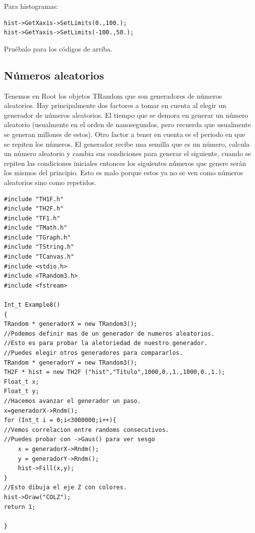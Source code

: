 \documentclass{article}
\begin{document}
Para histogramas:

\begin{tcolorbox} [breakable]
\begin{verbatim}
hist->GetXaxis->SetLimits(0.,100.);
hist->GetYaxis->SetLimits(-100.,50.);
\end{verbatim}
\end{tcolorbox}

Pru\'ebalo para los c\'odigos de arriba.

\subsection{N\'umeros aleatorios}

Tenemos en Root los objetos TRandom que son generadores de n\'umeros aleatorios. Hay principalmente dos factores a tomar en cuenta al elegir un generador de n\'umeros aleatorios. El tiempo que se demora en generar un n\'umero aleatorio (usualmente en el orden de nanosegundos, pero recuerda que usualmente se generan millones de estos). Otro factor a tener en cuenta es el periodo en que se repiten los n\'umeros. El generador recibe una semilla que es un n\'umero, calcula un n\'umero aleatorio y cambia sus condiciones para generar el siguiente, cuando se repiten las condiciones iniciales entonces los siguientes n\'umeros que genere ser\'an los mismos del principio. Esto es malo porque estos ya no se ven como n\'umeros aleatorios sino como repetidos.

\begin{tcolorbox} [breakable]
\begin{verbatim}
#include "TH1F.h"
#include "TH2F.h"
#include "TF1.h"
#include "TMath.h"
#include "TGraph.h"
#include "TString.h"
#include "TCanvas.h"
#include <stdio.h>
#include <TRandom3.h>
#include <fstream>

Int_t Example8()
{
TRandom * generadorX = new TRandom3();
//Podemos definir mas de un generador de numeros aleatorios.
//Esto es para probar la aletoriedad de nuestro generador.
//Puedes elegir otros generadores para compararlos.
TRandom * generadorY = new TRandom3();
TH2F * hist = new TH2F ("hist","Titulo",1000,0.,1.,1000,0.,1.);
Float_t x;
Float_t y;
//Hacemos avanzar el generador un paso.
x=generadorX->Rndm();
for (Int_t i = 0;i<3000000;i++){
//Vemos correlacion entre randoms consecutivos.
//Puedes probar con ->Gaus() para ver sesgo
	x = generadorX->Rndm();
	y = generadorY->Rndm();
	hist->Fill(x,y);
}
//Esto dibuja el eje Z con colores.
hist->Draw("COLZ");
return 1;

}
\end{verbatim}
\end{tcolorbox}
\end{document}
